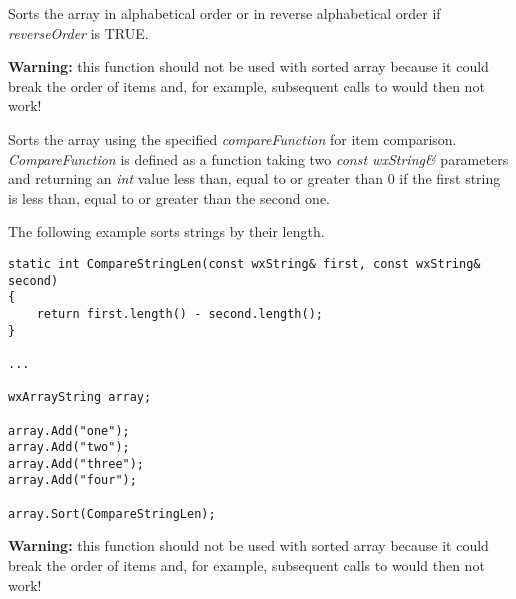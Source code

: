 Sorts the array in alphabetical order or in reverse alphabetical order if 
{\it reverseOrder} is TRUE.

{\bf Warning:} this function should not be used with sorted array because it
could break the order of items and, for example, subsequent calls to 
 would then not work!


Sorts the array using the specified {\it compareFunction} for item comparison.
{\it CompareFunction} is defined as a function taking two {\it const
wxString\&} parameters and returning an {\it int} value less than, equal to or
greater than 0 if the first string is less than, equal to or greater than the
second one.


The following example sorts strings by their length.

\begin{verbatim}
static int CompareStringLen(const wxString& first, const wxString& second)
{
    return first.length() - second.length();
}

...

wxArrayString array;

array.Add("one");
array.Add("two");
array.Add("three");
array.Add("four");

array.Sort(CompareStringLen);
\end{verbatim}

{\bf Warning:} this function should not be used with sorted array because it
could break the order of items and, for example, subsequent calls to 
 would then not work!

